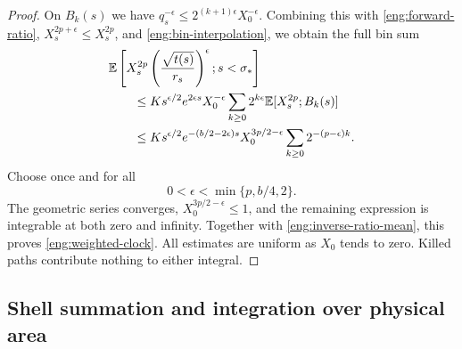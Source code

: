 \begin{proof}
On $B_k(s)$ we have
$q_s^{-\epsilon}\le2^{(k+1)\epsilon}X_0^{-\epsilon}$.
Combining this with \eqref{eng:forward-ratio},
$X_s^{2p+\epsilon}\le X_s^{2p}$, and
\eqref{eng:bin-interpolation}, we obtain the full bin sum
\begin{align}
 &\mathbb E\left[X_s^{2p}
       \left(\frac{\sqrt{t(s)}}{r_s}\right)^\epsilon;
                  s<\sigma_*\right] \notag\\
 &\qquad\le K s^{\epsilon/2}e^{2\epsilon s}X_0^{-\epsilon}
       \sum_{k\ge0}2^{k\epsilon}\mathbb E[X_s^{2p};B_k(s)] \notag\\
 &\qquad\le
 K s^{\epsilon/2}e^{-(b/2-2\epsilon)s}
       X_0^{3p/2-\epsilon}
       \sum_{k\ge0}2^{-(p-\epsilon)k}.
 \label{eng:bin-sum}
\end{align}
Choose once and for all
\begin{equation}\label{eng:epsilon-choice}
 0<\epsilon<\min\{p,b/4,2\}.
\end{equation}
The geometric series converges, $X_0^{3p/2-\epsilon}\le1$, and the
remaining expression is integrable at both zero and infinity.
Together with \eqref{eng:inverse-ratio-mean}, this proves
\eqref{eng:weighted-clock}.  All estimates are uniform as $X_0$ tends
to zero.  Killed paths contribute nothing to either integral.
\end{proof}

\subsection{Shell summation and integration over physical area}

